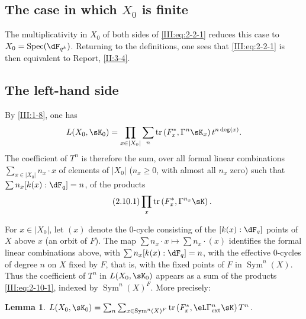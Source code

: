 \documentclass[12pt,oneside,english]{smfbook}
\DeclareMathOperator{\spec}{Spec}
\DeclareMathOperator{\tr}{tr}
\newtheorem{lemma_}[subsection]{Lemma}
\begin{document}
\subsection{The case in which $X_0$ is finite}\label{III:2-9}

The multiplicativity in $X_0$ of both sides of \eqref{III:eq:2-2-1} reduces this case to $X_0=\spec(\dF_{q^k})$. Returning to the definitions, one sees that \eqref{III:eq:2-2-1} is then equivalent to Report, \ref{II:3-4}.

\subsection{The left-hand side}\label{III:2-10}

By \ref{III:1-8}, one has
\[
  L(X_0,\sK_0) = \prod_{x\in |X_0|} \sum_n
  \tr\left(F_x^*,\Gamma^n\sK_x\right)t^{n\deg(x)} \text{.}
\]
The coefficient of $T^n$ is therefore the sum, over all formal linear combinations $\sum_{x\in|X_0|}n_x\cdot x$ of elements of $|X_0|$ ($n_x\geqslant0$, with almost all $n_x$ zero) such that $\sum n_x[k(x):\dF_q]=n$, of the products
\begin{equation*}\tag{2.10.1}\label{III:eq:2-10-1}
  \prod_x \tr\left(F_x^*,\Gamma^{n_x} \sK\right) \text{.}
\end{equation*}

For $x\in|X_0|$, let $(x)$ denote the $0$-cycle consisting of the $[k(x):\dF_q]$ points of $X$ above $x$ (an orbit of $F$). The map $\sum n_x\cdot x\mapsto\sum n_x\cdot(x)$ identifies the formal linear combinations above, with $\sum n_x[k(x):\dF_q]=n$, with the effective $0$-cycles of degree $n$ on $X$ fixed by $F$, that is, with the fixed points of $F$ in $\operatorname{Sym}^n(X)$. Thus the coefficient of $T^n$ in $L(X_0,\sK_0)$ appears as a sum of the products \eqref{III:eq:2-10-1}, indexed by $\operatorname{Sym}^n(X)^F$. More precisely:

\begin{lemma_}\label{III:2-11}
 $L(X_0,\sK_0) = \sum_n \sum_{x\in\operatorname{Sym}^n(X)^F} \tr\left(F_x^*,\eL\Gamma_\textnormal{ext}^n \sK\right) T^n$.
\end{lemma_}
\end{document}
